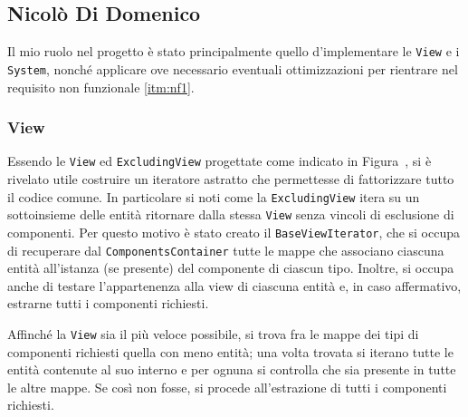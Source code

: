 \subsection{Nicolò Di Domenico}\label{subsec:nicolò-di-domenico}

Il mio ruolo nel progetto è stato principalmente quello d'implementare le \texttt{View} e i \texttt{System}, nonché
applicare ove necessario eventuali ottimizzazioni per rientrare nel requisito non funzionale \ref{itm:nf1}.

\subsubsection{View}

Essendo le \texttt{View} ed \texttt{ExcludingView} progettate come indicato in Figura~, si è rivelato utile costruire un
iteratore astratto che permettesse di fattorizzare tutto il codice comune.
In particolare si noti come la \texttt{ExcludingView} itera su un sottoinsieme delle entità ritornare dalla stessa
\texttt{View} senza vincoli di esclusione di componenti.
Per questo motivo è stato creato il \texttt{BaseViewIterator}, che si occupa di recuperare dal
\texttt{ComponentsContainer} tutte le mappe che associano ciascuna entità all'istanza (se presente) del componente di
ciascun tipo.
Inoltre, si occupa anche di testare l'appartenenza alla view di ciascuna entità e, in caso affermativo, estrarne tutti i
componenti richiesti.

Affinché la \texttt{View} sia il più veloce possibile, si trova fra le mappe dei tipi di componenti richiesti quella con
meno entità;
una volta trovata si iterano tutte le entità contenute al suo interno e per ognuna si controlla che sia presente in
tutte le altre mappe.
Se così non fosse, si procede all'estrazione di tutti i componenti richiesti.